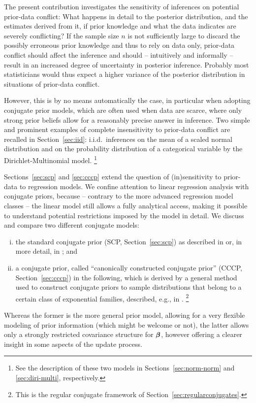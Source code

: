 The present contribution investigates the sensitivity of inferences on potential prior-data conflict:
What happens in detail to the posterior distribution, and the estimates derived from it, if prior knowledge and
what the data indicates are severely conflicting?
If the sample size $n$ is not sufficiently large to discard the
possibly erroneous prior knowledge and thus to rely on data only,
prior-data conflict should affect the inference and
should  -- intuitively and informally --  result in an increased degree
of uncertainty in posterior inference. Probably most statisticians would thus expect
a higher variance of the posterior distribution in situations of prior-data conflict.

However, this is by no means automatically the case,
in particular when adopting conjugate prior models,
which are often used when data are
scarce, where only strong prior beliefs allow for a reasonably
precise answer in inference. Two simple and prominent examples
of complete insensitivity to prior-data conflict are recalled in
Section~\ref{sec:iid}: i.i.d.\ inferences on the mean of a scaled normal distribution
and on the probability distribution of a categorical variable by the Dirichlet-Multinomial model.%
\footnote{See the description of these two models in Sections~\ref{sec:norm-norm} and \ref{sec:diri-multi}, respectively.}

Sections~\ref{sec:scp} and \ref{sec:cccp} extend
the question of (in)sensitivity to prior-data to regression models.
We confine attention to linear regression analysis with conjugate priors,
because -- contrary to the more advanced regression model classes --
the linear model still allows a fully analytical access, making it possible to understand
potential restrictions imposed by the model in detail.
We discuss and compare two different conjugate models:
\begin{enumerate}[(i)]
\item the standard conjugate prior (SCP, Section~\ref{sec:scp}) as described in \textcite{2013:fahrmeier-kneib-lang-marx} or,
in more detail, in \textcite{1994:ohagan}; and
\item a conjugate prior, called ``canonically constructed conjugate prior'' (CCCP, Section~\ref{sec:cccp}) in the following,
which is derived by a general method used to construct conjugate priors to sample distributions that
belong to a certain class of exponential families, described, e.g., in \textcite{2000:bernardosmith}.%
\footnote{This is the regular conjugate framework of Section~\ref{sec:regularconjugates}.}
\end{enumerate}
Whereas the former is the more general prior model, allowing for
a very flexible modeling of prior information (which might be welcome or not),
the latter allows only a strongly restricted covariance structure for $\boldsymbol{\beta}$,
however offering a clearer insight in some aspects of the update process.

